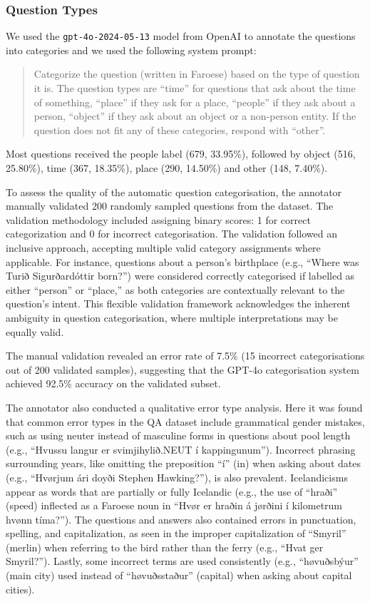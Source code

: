 \documentclass[11pt]{article}
\begin{document}
\subsubsection{Question Types}
We used the \texttt{gpt-4o-2024-05-13} model from OpenAI to annotate the questions into
categories and we used the following system prompt:

\begin{quote}
    \small
    Categorize the question (written in Faroese) based on the type of question it is.
    The question types are ``time'' for questions that ask about the time of something,
    ``place'' if they ask for a place, ``people'' if they ask about a person, ``object''
    if they ask about an object or a non-person entity. If the question does not fit any
    of these categories, respond with ``other''.
\end{quote}

Most questions received the people label (679, 33.95\%), followed by object (516,
25.80\%), time (367, 18.35\%), place (290, 14.50\%) and other (148, 7.40\%).

To assess the quality of the automatic question categorisation, the annotator manually
validated 200 randomly sampled questions from the dataset. The validation methodology
included assigning binary scores: 1 for correct categorization and 0 for incorrect
categorisation. The validation followed an inclusive approach, accepting multiple valid
category assignments where applicable. For instance, questions about a person's
birthplace (e.g., ``Where was Turið Sigurðardóttir born?'') were considered correctly
categorised if labelled as either ``person'' or ``place,'' as both categories are
contextually relevant to the question's intent. This flexible validation framework
acknowledges the inherent ambiguity in question categorisation, where multiple
interpretations may be equally valid.

The manual validation revealed an error rate of 7.5\% (15 incorrect categorisations out
of 200 validated samples), suggesting that the GPT-4o categorisation system achieved
92.5\% accuracy on the validated subset.

The annotator also conducted a qualitative error type analysis. Here it was found that
common error types in the QA dataset include grammatical gender mistakes, such as using
neuter instead of masculine forms in questions about pool length (e.g., ``Hvussu langur
er svimjihylið.NEUT í kappingunum''). Incorrect phrasing surrounding years, like
omitting the preposition ``í'' (in) when asking about dates (e.g., ``Hvørjum ári doyði
Stephen Hawking?''), is also prevalent. Icelandicisms appear as words that are partially
or fully Icelandic (e.g., the use of ``hraði'' (speed) inflected as a Faroese noun in
``Hvør er hraðin á jørðini í kilometrum hvønn tíma?''). The questions and answers also
contained errors in punctuation, spelling, and capitalization, as seen in the improper
capitalization of ``Smyril'' (merlin) when referring to the bird rather than the ferry
(e.g., ``Hvat ger Smyril?''). Lastly, some incorrect terms are used consistently (e.g.,
``høvuðsbýur'' (main city) used instead of ``høvuðsstaður'' (capital) when asking about
capital cities).
\end{document}
